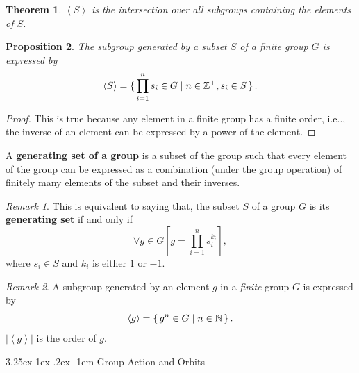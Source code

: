 \documentclass[12pt, letterpaper]{article}
\makeatletter
\newcommand{\nat}{\mathbb{N}}
\newcommand{\inte}{\mathbb{Z}}
\newcommand\ie{i.e\@ifnextchar.{}{.\@}}
\newcommand{\card}[1]{\left\lvert #1 \right\rvert}
\newcommand{\gensub}[1]{\left\langle{#1}\right\rangle}
\newtheorem{prop}{Proposition}[section]
\newtheorem{thm}[prop]{Theorem}
\renewcommand\paragraph{\@startsection{paragraph}{4}{\z@}%
	{3.25ex \@plus1ex \@minus.2ex}%
	{-1em}%
	{\normalfont\normalsize\bfseries}}
\theoremstyle{definition}
\theoremstyle{remark}
\newtheorem*{rem*}{Remark}
\theoremstyle{definition}
\theoremstyle{plain}
\numberwithin{equation}{section}
\makeatother
\begin{document}
	\begin{thm}
		$\gensub{S}$ is the intersection over all subgroups containing the elements of $S$.
	\end{thm}

	\begin{prop}
		The subgroup generated by a subset $S$ of a finite group $G$ is expressed by
		\[\gensub{S} = \set{\prod_{i=1}^{n}s_i\in G|n\in \inte^+,s_i\in S}.\]
	\end{prop}
	\begin{proof}
		This is true because any element in a finite group has a finite order, \ie,
		the inverse of an element can be expressed by a power of the element.
	\end{proof}
	
	\begin{def*}
		A \textbf{generating set of a group} is a subset of the group 
		such that every element of the group can be expressed as a combination
		(under the group operation) of finitely many elements of the subset and their inverses.
	\end{def*}
	\begin{rem*}
		This is equivalent to saying that,
		the subset $S$ of a group $G$ is its \textbf{generating set} if and only if
		\[\forall g \in G \left[g = \prod_{i=1}^{n}s_i^{k_i}\right],\]
		where $s_i \in S$ and $k_i$ is either $1$ or $-1$.
	\end{rem*}

	\begin{rem*}
		A subgroup generated by an element $g$ in a \textit{finite} group $G$ is expressed by
		\[\gensub{g}=\set{g^n\in G|n\in\nat}.\]
		$\card{\gensub{g}}$ is the order of $g$.
	\end{rem*}

	\paragraph{Group Action and Orbits}
	
\end{document}
